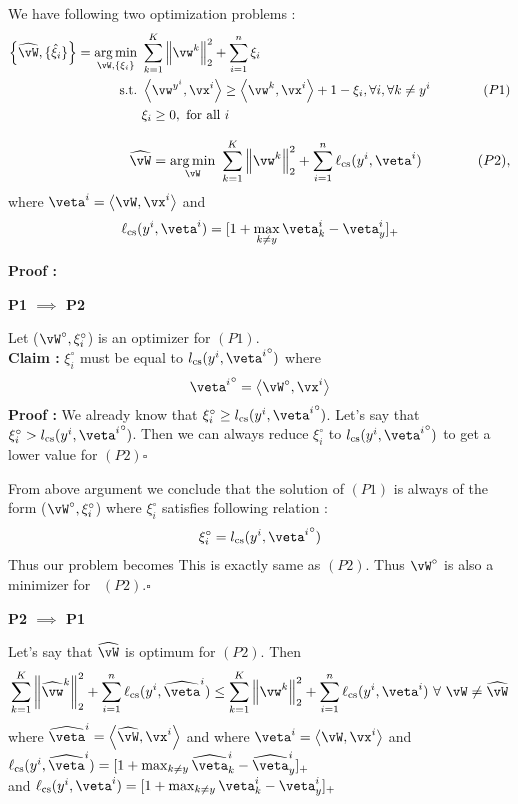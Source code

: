 \documentclass[a4paper,11pt]{article}
\begin{document}
\begin{mlsolution}
We have following two optimization problems : 
\begin{align*}
\bc{\widehat\vW, \{\hat\xi_i\}} = \underset{\vW,\bc{\xi_i}}{\arg\min}&\ \sum_{k=1}^K\norm{\vw^k}_2^2 + \sum_{i=1}^n\xi_i\\
\text{s.t.} &\ \ip{\vw^{y^i}}{\vx^i} \geq \ip{\vw^k}{\vx^i} + 1 - \xi_i, \forall i, \forall k \neq y^i\qquad\qquad{(P1)}\\
&\ \xi_i \geq 0, \text{ for all } i
\end{align*}


\[
	\phantom{\hspace{20ex}}\widehat\vW = \underset{\vW}{\arg\min}\ \sum_{k=1}^K\norm{\vw^k}_2^2 + \sum_{i=1}^n\ell_\text{cs}(y^i,\veta^i)\qquad\qquad{(P2)},
	\]
	where $\veta^i = \ip{\vW}{\vx^i}$ and
	\[
	\ell_\text{cs}(y^i,\veta^i) = [1 + \max_{k \neq y}\veta^i_k - \veta^i_y]_+
	\]
\vspace{1cm}	

\textbf{Proof : }\par
\textbf{P1 $\implies$ P2}\par
\vspace{0.25cm}
Let ($\vW^{\circ}, \xi_i^{\circ}$)  is an optimizer for $(P1)$.\\
\textbf{Claim : }$\xi_i^{\circ}$ must be equal to $l_\text{cs}(y^i,{\veta^i}^{\circ})$ where
\begin{equation}
{\veta^i}^{\circ} = \ip{\vW^{\circ}}{\vx^i}
\end{equation}
\textbf{Proof : }We already know that $\xi_i^{\circ} \geq l_\text{cs}(y^i,{\veta^i}^{\circ})$. Let's say that $\xi_i^{\circ} > l_\text{cs}(y^i,{\veta^i}^{\circ})$. Then we can always reduce $\xi_i^{\circ}$ to $l_\text{cs}(y^i,{\veta^i}^{\circ})$ to get a lower value for $(P2)$\hfill $\square$\par
From above argument we conclude that the solution of $(P1)$ is always of the form ($\vW^{\circ}, \xi_i^{\circ}$) where $\xi_i^{\circ}$ satisfies following relation :
\begin{align*}
\xi_i^{\circ} = l_\text{cs}(y^i,{\veta^i}^{\circ})
\end{align*}
Thus our problem becomes
This is exactly same as $(P2)$. Thus $\vW^{\circ}$ is also a minimizer for \, $(P2)$.\hfill $\square$

\vspace{1cm}

\textbf{P2 $\implies$ P1}\par
\vspace{0.25cm}
Let's say that $\widehat{\vW}$ is optimum for $(P2)$. Then
\begin{equation*}
\sum_{k=1}^K\norm{\widehat{\vw}^k}_2^2 + \sum_{i=1}^n\ell_\text{cs}(y^i,\widehat\veta^i) \leq  \sum_{k=1}^K\norm{\vw^k}_2^2 + \sum_{i=1}^n\ell_\text{cs}(y^i,\veta^i)\  \forall\  \vW \neq \widehat{\vW}
\end{equation*}
where $\widehat\veta^i = \ip{\widehat\vW}{\vx^i}$ and where $\veta^i = \ip{\vW}{\vx^i}$  
and $\ell_\text{cs}(y^i,\widehat\veta^i) = [1 + \max_{k \neq y}\widehat\veta^i_k - \widehat\veta^i_y]_+$\\
and $\ell_\text{cs}(y^i,\veta^i) = [1 + \max_{k \neq y}\veta^i_k - \veta^i_y]_+$


\end{mlsolution}
\end{document}
